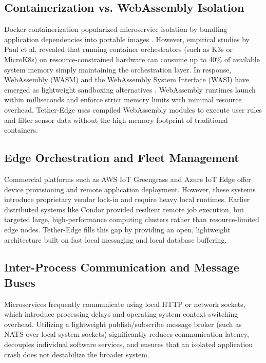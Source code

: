 \documentclass[conference]{IEEEtran}
\begin{document}
    \subsection{Containerization vs. WebAssembly Isolation}
    Docker containerization popularized microservice isolation by bundling application dependencies into portable images \cite{b7, b8}. However, empirical studies
    by Paul et al. \cite{b13} revealed that running container orchestrators (such as K3s or MicroK8s) on resource-constrained hardware can consume up to 40\% of
    available system memory simply maintaining the orchestration layer. In response, WebAssembly (WASM) and the WebAssembly System Interface (WASI) have emerged as
    lightweight sandboxing alternatives \cite{b12}. WebAssembly runtimes launch within milliseconds and enforce strict memory limits with minimal resource
    overhead. Tether-Edge uses compiled WebAssembly modules to execute user rules and filter sensor data without the high memory footprint of traditional
    containers.

    \subsection{Edge Orchestration and Fleet Management}
    Commercial platforms such as AWS IoT Greengrass \cite{b9} and Azure IoT Edge \cite{b10} offer device provisioning and remote application deployment. However,
    these systems introduce proprietary vendor lock-in and require heavy local runtimes. Earlier distributed systems like Condor \cite{b11} provided resilient
    remote job execution, but targeted large, high-performance computing clusters rather than resource-limited edge nodes. Tether-Edge fills this gap by providing
    an open, lightweight architecture built on fast local messaging and local database buffering.

    \subsection{Inter-Process Communication and Message Buses}
    Microservices frequently communicate using local HTTP or network sockets, which introduce processing delays and operating system context-switching overhead.
    Utilizing a lightweight publish/subscribe message broker (such as NATS over local system sockets) significantly reduces communication latency, decouples
    individual software services, and ensures that an isolated application crash does not destabilize the broader system.
\end{document}
